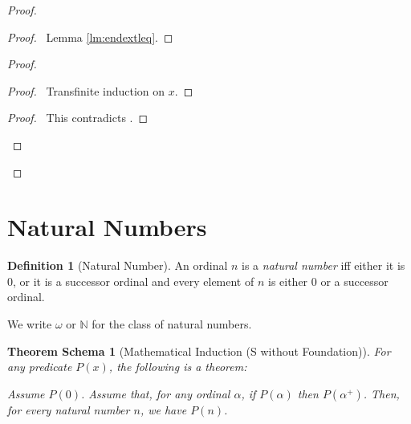 \documentclass{book}
\let\qed\relax
\newtheorem{thms}[ax]{Theorem Schema}
\theoremstyle{definition}
\newtheorem{df}[ax]{Definition}
\begin{document}
\begin{proof}
\begin{proof}
	\pf\ Lemma \ref{lm:endextleq}.
\end{proof}
\begin{proof}
	\begin{proof}
		\pf\ Transfinite induction on $x$.
	\end{proof}
	\qedstep
	\begin{proof}
		\pf\ This contradicts .
	\end{proof}
\end{proof}
\qed
\end{proof}

\section{Natural Numbers}

\begin{df}[Natural Number]
An ordinal $n$ is a \emph{natural number} iff either it is 0, or it is a successor ordinal and every element of $n$ is either 0 or a successor ordinal.

We write $\omega$ or $\mathbb{N}$ for the class of natural numbers.
\end{df}

\begin{thms}[Mathematical Induction (S without Foundation)]
For any predicate $P(x)$, the following is a theorem:

Assume $P(0)$. Assume that, for any ordinal $\alpha$, if $P(\alpha)$ then $P(\alpha^+)$. Then, for every natural number $n$, we have $P(n)$.
\end{thms}
\end{document}

